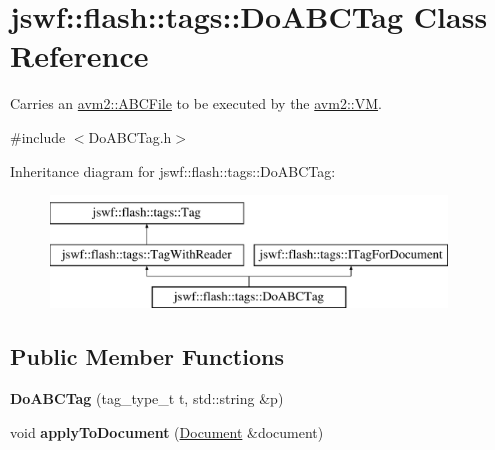 \hypertarget{classjswf_1_1flash_1_1tags_1_1_do_a_b_c_tag}{\section{jswf\+:\+:flash\+:\+:tags\+:\+:Do\+A\+B\+C\+Tag Class Reference}
\label{classjswf_1_1flash_1_1tags_1_1_do_a_b_c_tag}
}


Carries an {\ttfamily \hyperlink{classjswf_1_1avm2_1_1_a_b_c_file}{avm2\+::\+A\+B\+C\+File}} to be executed by the \hyperlink{classjswf_1_1avm2_1_1_v_m}{avm2\+::\+V\+M}.  




{\ttfamily \#include $<$Do\+A\+B\+C\+Tag.\+h$>$}

Inheritance diagram for jswf\+:\+:flash\+:\+:tags\+:\+:Do\+A\+B\+C\+Tag\+:\begin{figure}[H]
\begin{center}
\leavevmode
\includegraphics[height=3.000000cm]{classjswf_1_1flash_1_1tags_1_1_do_a_b_c_tag}
\end{center}
\end{figure}
\subsection*{Public Member Functions}
\begin{DoxyCompactItemize}
\item 
\hypertarget{classjswf_1_1flash_1_1tags_1_1_do_a_b_c_tag_aa6535b97433481386663fcc15de1facd}{{\bfseries Do\+A\+B\+C\+Tag} (tag\+\_\+type\+\_\+t t, std\+::string \&p)}\label{classjswf_1_1flash_1_1tags_1_1_do_a_b_c_tag_aa6535b97433481386663fcc15de1facd}

\item 
\hypertarget{classjswf_1_1flash_1_1tags_1_1_do_a_b_c_tag_a7ca7c629347fdfbab3d39bed07f79d76}{void {\bfseries apply\+To\+Document} (\hyperlink{classjswf_1_1flash_1_1_document}{Document} \&document)}\label{classjswf_1_1flash_1_1tags_1_1_do_a_b_c_tag_a7ca7c629347fdfbab3d39bed07f79d76}

\end{DoxyCompactItemize}
